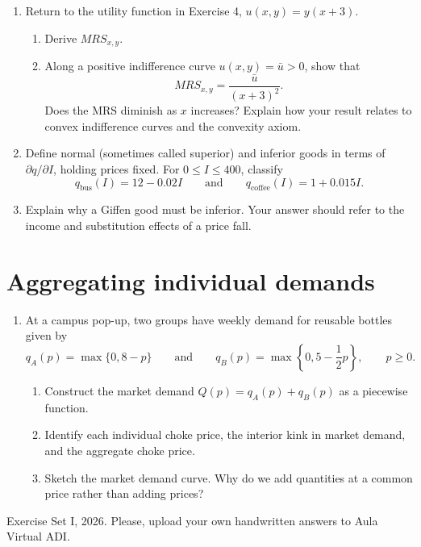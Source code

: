 \documentclass[11pt,a4paper]{article}
\begin{document}
\begin{enumerate}[label=\textbf{9.\alph*}]
  \item Return to the utility function in Exercise 4,
  \(u(x,y)=y(x+3)\).
  \begin{enumerate}[label=(\roman*)]
    \item Derive \(MRS_{x,y}\).
    \item Along a positive indifference curve \(u(x,y)=\bar u>0\), show that
    \[
      MRS_{x,y}=\frac{\bar u}{(x+3)^2}.
    \]
    Does the MRS diminish as \(x\) increases? Explain how your result relates
    to convex indifference curves and the convexity axiom.
  \end{enumerate}
  \item Define normal (sometimes called superior) and inferior goods in terms of
  \(\partial q/\partial I\), holding prices fixed. For
  \(0\leq I\leq 400\), classify
  \[
    q_{\mathrm{bus}}(I)=12-0.02I
    \qquad\text{and}\qquad
    q_{\mathrm{coffee}}(I)=1+0.015I.
  \]
  \item Explain why a Giffen good must be inferior. Your answer should refer
  to the income and substitution effects of a price fall.
\end{enumerate}

\section{Aggregating individual demands}

\begin{enumerate}[label=\textbf{10.\alph*}]
  \item At a campus pop-up, two groups have weekly demand for reusable bottles
  given by
  \[
    q_A(p)=\max\{0,8-p\}
    \qquad\text{and}\qquad
    q_B(p)=\max\left\{0,5-\frac{1}{2}p\right\},
    \qquad p\geq0.
  \]
  \begin{enumerate}[label=(\roman*)]
    \item Construct the market demand \(Q(p)=q_A(p)+q_B(p)\) as a piecewise
    function.
    \item Identify each individual choke price, the interior kink in market
    demand, and the aggregate choke price.
    \item Sketch the market demand curve. Why do we add quantities at a common
    price rather than adding prices?
  \end{enumerate}
\end{enumerate}

\vfill
\begin{center}
  {\sffamily\small\color{PPEMuted}
  Exercise Set I, 2026. Please, upload your own handwritten answers to Aula Virtual ADI.}
\end{center}
\end{document}

